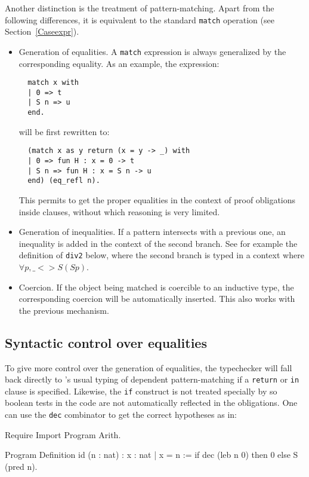 Another distinction is the treatment of pattern-matching. Apart from the
following differences, it is equivalent to the standard {\tt match}
operation (see Section~\ref{Caseexpr}).
\begin{itemize}
\item Generation of equalities. A {\tt match} expression is always
  generalized by the corresponding equality. As an example,
  the expression: 

\begin{verbatim}
  match x with
  | 0 => t
  | S n => u
  end.
\end{verbatim}
will be first rewritten to:
\begin{verbatim}
  (match x as y return (x = y -> _) with
  | 0 => fun H : x = 0 -> t
  | S n => fun H : x = S n -> u
  end) (eq_refl n).
\end{verbatim}

  This permits to get the proper equalities in the context of proof
  obligations inside clauses, without which reasoning is very limited.

\item Generation of inequalities. If a pattern intersects with a
  previous one, an inequality is added in the context of the second
  branch. See for example the definition of {\tt div2} below, where the second
  branch is typed in a context where $\forall p, \_ <> S (S p)$.
  
\item Coercion. If the object being matched is coercible to an inductive
  type, the corresponding coercion will be automatically inserted. This also
  works with the previous mechanism.
\end{itemize}

\subsection{Syntactic control over equalities}
\label{ProgramSyntax}
To give more control over the generation of equalities, the typechecker will
fall back directly to \Coq's usual typing of dependent pattern-matching
if a {\tt return} or {\tt in} clause is specified. Likewise,
the {\tt if} construct is not treated specially by \Program{} so boolean
tests in the code are not automatically reflected in the obligations. 
One can use the {\tt dec} combinator to get the correct hypotheses as in:

\begin{coq_eval}
Require Import Program Arith.
\end{coq_eval}
\begin{coq_example}
Program Definition id (n : nat) : { x : nat | x = n } :=
  if dec (leb n 0) then 0
  else S (pred n).
\end{coq_example}

